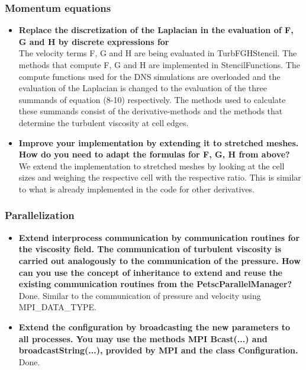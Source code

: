 \documentclass[a4paper]{article}
\begin{document}
\subsubsection{Momentum equations}
\begin{itemize}
	\item \textbf{Replace the discretization of the Laplacian in the evaluation of F, G and H by discrete expressions for}\\
	The velocity terms F, G and H are being evaluated in TurbFGHStencil. The methods that compute F, G and H are implemented in StencilFunctions. The compute functions used for the DNS simulations are overloaded and the evaluation of the Laplacian is changed to the evaluation of the three summands of equation (8-10) respectively.  The methods used to calculate these summands consist of the derivative-methods and the methods that determine the turbulent viscosity at cell edges. 
	\item \textbf{Improve your implementation by extending it to stretched meshes. How do you need to adapt the formulas for F, G, H from above?}\\
	We extend the implementation to stretched meshes by looking at the cell sizes and weighing the respective cell with the respective ratio. This is similar to what is already implemented in the code for other derivatives.
\end{itemize}

\subsubsection{Parallelization}
\begin{itemize}
	\item \textbf{Extend interprocess communication by communication routines for the viscosity field. The communication of turbulent viscosity is carried out analogously to the communication of the pressure. How can you use the concept of inheritance to extend and reuse the existing communication routines from the PetscParallelManager?}\\
	Done. Similar to the communication of pressure and velocity using MPI\_DATA\_TYPE.
	\item \textbf{Extend the configuration by broadcasting the new parameters to all processes. You may use the methods MPI Bcast(...) and broadcastString(...), provided by MPI and the class Configuration.}\\
	Done.
\end{itemize}
\end{document}
